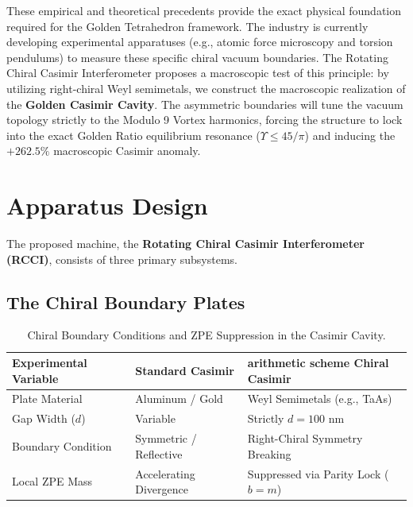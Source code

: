 These empirical and theoretical precedents provide the exact physical foundation required for the Golden Tetrahedron framework. The industry is currently developing experimental apparatuses (e.g., atomic force microscopy and torsion pendulums) to measure these specific chiral vacuum boundaries. The Rotating Chiral Casimir Interferometer proposes a macroscopic test of this principle: by utilizing right-chiral Weyl semimetals, we construct the macroscopic realization of the \textbf{Golden Casimir Cavity}. The asymmetric boundaries will tune the vacuum topology strictly to the Modulo 9 Vortex harmonics, forcing the structure to lock into the exact Golden Ratio equilibrium resonance ($\Upsilon \le 45/\pi$) and inducing the $+262.5\%$ macroscopic Casimir anomaly.

\section{Apparatus Design}\label{sec:design}

The proposed machine, the \textbf{Rotating Chiral Casimir Interferometer (RCCI)}, consists of three primary subsystems.

\subsection{The Chiral Boundary Plates}\label{sec:plates}

\begin{table}[ht]
\centering
\begin{tabular}{|l|l|l|}
\hline
\textbf{Experimental Variable} & \textbf{Standard Casimir} & \textbf{arithmetic scheme Chiral Casimir} \\
\hline
Plate Material & Aluminum / Gold & Weyl Semimetals (e.g., TaAs) \\
Gap Width ($d$) & Variable & Strictly $d = 100$ nm \\
Boundary Condition & Symmetric / Reflective & Right-Chiral Symmetry Breaking \\
Local ZPE Mass & Accelerating Divergence & Suppressed via Parity Lock ($b=m$) \\
\hline
\end{tabular}
\caption{Chiral Boundary Conditions and ZPE Suppression in the Casimir Cavity.}
\label{tab:chiral_casimir}
\end{table}

